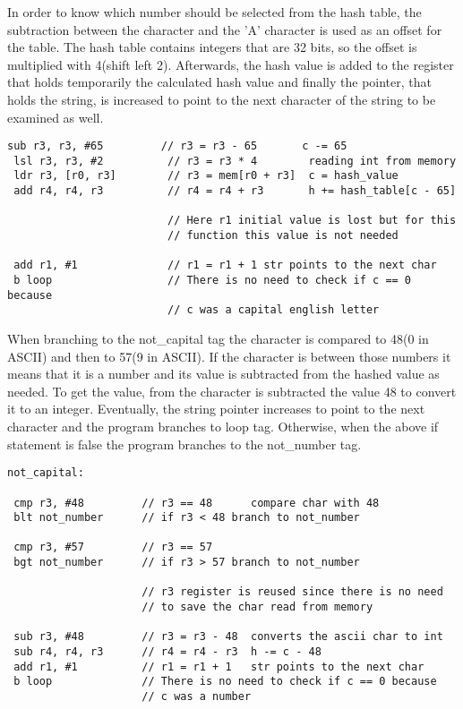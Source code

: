 \documentclass[a4paper, 12pt]{report}
\begin{document}
    In order to know which number should be selected from 
    the hash table, the subtraction between the character and the 'A' character is used as an offset for the
    table. The hash table contains integers that are 32 bits, so the offset is multiplied with 4(shift left 2).
    Afterwards, the hash value is added to the register that holds temporarily the calculated hash value and finally
    the pointer, that holds the string, is increased to point to the next character of the string 
    to be examined as well. 
    \begin{lstlisting}[language = assembly]
 sub r3, r3, #65         // r3 = r3 - 65       c -= 65
 lsl r3, r3, #2          // r3 = r3 * 4        reading int from memory
 ldr r3, [r0, r3]        // r3 = mem[r0 + r3]  c = hash_value
 add r4, r4, r3          // r4 = r4 + r3       h += hash_table[c - 65]
		
                         // Here r1 initial value is lost but for this
                         // function this value is not needed
								
 add r1, #1              // r1 = r1 + 1 str points to the next char
 b loop                  // There is no need to check if c == 0 because 
                         // c was a capital english letter
    \end{lstlisting}
    \bigskip

    When branching to the not\_capital tag the character is compared to 48(0 in ASCII) and then to 57(9 in ASCII).
    If the character is between those numbers it means that it is a number and its value is subtracted from the hashed
    value as needed. To get the value, from the character is subtracted the value 48 to convert it to an integer.
    Eventually, the string pointer increases to point to the next character and the program branches to loop tag.
    Otherwise, when the above if statement is false the program branches to the not\_number tag.

    \begin{lstlisting}[language = assembly]
 not_capital:
		
 cmp r3, #48         // r3 == 48      compare char with 48
 blt not_number      // if r3 < 48 branch to not_number
		
 cmp r3, #57         // r3 == 57
 bgt not_number      // if r3 > 57 branch to not_number
			
                     // r3 register is reused since there is no need
                     // to save the char read from memory
								
 sub r3, #48         // r3 = r3 - 48  converts the ascii char to int
 sub r4, r4, r3      // r4 = r4 - r3  h -= c - 48
 add r1, #1          // r1 = r1 + 1   str points to the next char
 b loop              // There is no need to check if c == 0 because 
                     // c was a number
    \end{lstlisting}
    \bigskip
\end{document}
